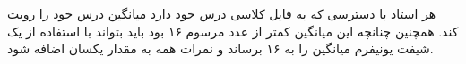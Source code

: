 هر استاد با دسترسی که به فایل کلاسی درس خود دارد میانگین درس خود را رویت کند. همچنین چنانچه این میانگین کمتر از عدد مرسوم ۱۶ بود باید
بتواند با استفاده از یک شیفت یونیفرم میانگین را به ۱۶ برساند و نمرات همه به مقدار یکسان اضافه شود.